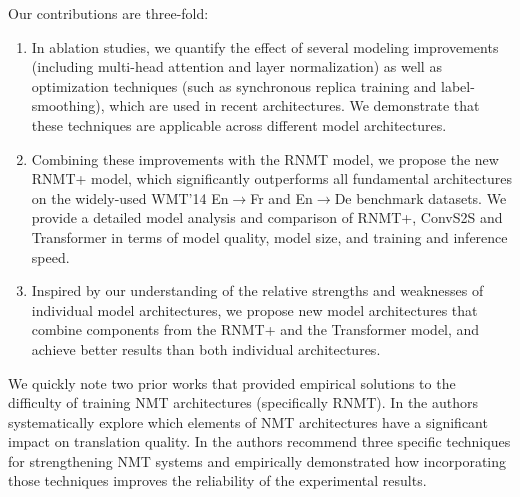 \documentclass[11pt,a4paper]{article}
\begin{document}
Our contributions are three-fold:
\begin{enumerate}
\item In ablation studies, we quantify the effect of several modeling
improvements (including
multi-head attention and layer normalization) as well as
optimization techniques (such as synchronous replica training and
label-smoothing), which are used in recent architectures.
We demonstrate that these techniques are applicable
across different model architectures.

\item Combining these improvements with the RNMT model, we propose the new RNMT+
model, which significantly outperforms all fundamental architectures on
the widely-used WMT'14 En$\rightarrow$Fr
and En$\rightarrow$De benchmark datasets. We provide a detailed
model analysis and comparison of RNMT+, ConvS2S and Transformer
in terms of model quality, model size, and training and inference speed.

\item Inspired by our understanding of the relative strengths and weaknesses
of individual model architectures, we propose new model architectures that
combine components from the RNMT+ and the Transformer model, and achieve better
results than both individual architectures.
\end{enumerate}

We quickly note two prior works that provided empirical solutions
to the difficulty of training NMT architectures (specifically RNMT).
In \cite{britz-EtAl:2017:EMNLP2017}
the authors systematically explore which elements of NMT architectures have a
significant impact on translation quality.
In \cite{denkowski-neubig:2017:NMT}
the authors recommend three specific techniques for strengthening NMT systems
and empirically demonstrated how incorporating those techniques improves the
reliability of the experimental results.
\end{document}
